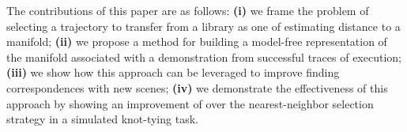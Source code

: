 The contributions of this paper are as follows: {\bf(i)} we frame the problem of selecting a trajectory to transfer
from a library as one of estimating distance to a manifold; {\bf(ii)} we propose a method for building a model-free
representation of the manifold associated with a demonstration from successful traces of execution; {\bf(iii)} we show
how this approach can be leveraged to improve finding correspondences with new scenes; {\bf(iv)} we demonstrate
the effectiveness of this approach by showing an improvement of  over the nearest-neighbor selection
strategy in a simulated knot-tying task.






